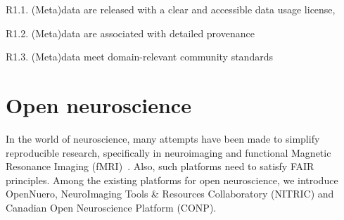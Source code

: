 \quad R1.1. (Meta)data are released with a clear and accessible data usage license,



\quad R1.2. (Meta)data are associated with detailed provenance


\quad R1.3. (Meta)data meet domain-relevant community standards




\section{Open neuroscience}
In the world of neuroscience, many attempts have been
 made to simplify reproducible research, specifically in neuroimaging and functional Magnetic Resonance Imaging (fMRI)~\cite{Schottner_2020}. Also, such platforms need to satisfy FAIR principles. Among the existing platforms for open neuroscience, we introduce OpenNuero, NeuroImaging Tools \& Resources Collaboratory (NITRIC) and Canadian Open Neuroscience Platform (CONP).


